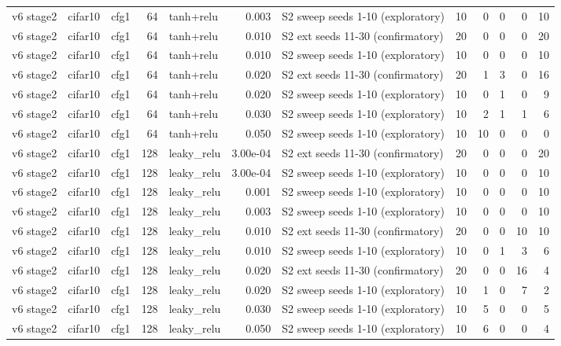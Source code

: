 \begin{table}[htbp]
{\begin{tabular}{@{}lllrlrlrrrrr@{}}
v6 stage2 & cifar10 & cfg1 & 64 & tanh+relu & 0.003 & S2 sweep seeds 1-10 (exploratory) & 10 & 0 & 0 & 0 & 10 \\
v6 stage2 & cifar10 & cfg1 & 64 & tanh+relu & 0.010 & S2 ext seeds 11-30 (confirmatory) & 20 & 0 & 0 & 0 & 20 \\
v6 stage2 & cifar10 & cfg1 & 64 & tanh+relu & 0.010 & S2 sweep seeds 1-10 (exploratory) & 10 & 0 & 0 & 0 & 10 \\
v6 stage2 & cifar10 & cfg1 & 64 & tanh+relu & 0.020 & S2 ext seeds 11-30 (confirmatory) & 20 & 1 & 3 & 0 & 16 \\
v6 stage2 & cifar10 & cfg1 & 64 & tanh+relu & 0.020 & S2 sweep seeds 1-10 (exploratory) & 10 & 0 & 1 & 0 & 9 \\
v6 stage2 & cifar10 & cfg1 & 64 & tanh+relu & 0.030 & S2 sweep seeds 1-10 (exploratory) & 10 & 2 & 1 & 1 & 6 \\
v6 stage2 & cifar10 & cfg1 & 64 & tanh+relu & 0.050 & S2 sweep seeds 1-10 (exploratory) & 10 & 10 & 0 & 0 & 0 \\
v6 stage2 & cifar10 & cfg1 & 128 & leaky\_relu & 3.00e-04 & S2 ext seeds 11-30 (confirmatory) & 20 & 0 & 0 & 0 & 20 \\
v6 stage2 & cifar10 & cfg1 & 128 & leaky\_relu & 3.00e-04 & S2 sweep seeds 1-10 (exploratory) & 10 & 0 & 0 & 0 & 10 \\
v6 stage2 & cifar10 & cfg1 & 128 & leaky\_relu & 0.001 & S2 sweep seeds 1-10 (exploratory) & 10 & 0 & 0 & 0 & 10 \\
v6 stage2 & cifar10 & cfg1 & 128 & leaky\_relu & 0.003 & S2 sweep seeds 1-10 (exploratory) & 10 & 0 & 0 & 0 & 10 \\
v6 stage2 & cifar10 & cfg1 & 128 & leaky\_relu & 0.010 & S2 ext seeds 11-30 (confirmatory) & 20 & 0 & 0 & 10 & 10 \\
v6 stage2 & cifar10 & cfg1 & 128 & leaky\_relu & 0.010 & S2 sweep seeds 1-10 (exploratory) & 10 & 0 & 1 & 3 & 6 \\
v6 stage2 & cifar10 & cfg1 & 128 & leaky\_relu & 0.020 & S2 ext seeds 11-30 (confirmatory) & 20 & 0 & 0 & 16 & 4 \\
v6 stage2 & cifar10 & cfg1 & 128 & leaky\_relu & 0.020 & S2 sweep seeds 1-10 (exploratory) & 10 & 1 & 0 & 7 & 2 \\
v6 stage2 & cifar10 & cfg1 & 128 & leaky\_relu & 0.030 & S2 sweep seeds 1-10 (exploratory) & 10 & 5 & 0 & 0 & 5 \\
v6 stage2 & cifar10 & cfg1 & 128 & leaky\_relu & 0.050 & S2 sweep seeds 1-10 (exploratory) & 10 & 6 & 0 & 0 & 4 \\

\end{tabular}}
\end{table}
